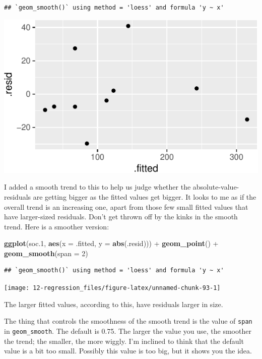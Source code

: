 \documentclass[]{tufte-book}
\newenvironment{Shaded}{}{}
\newcommand{\DataTypeTok}[1]{\textcolor[rgb]{0.56,0.13,0.00}{#1}}
\newcommand{\DecValTok}[1]{\textcolor[rgb]{0.25,0.63,0.44}{#1}}
\newcommand{\FloatTok}[1]{\textcolor[rgb]{0.25,0.63,0.44}{#1}}
\newcommand{\KeywordTok}[1]{\textcolor[rgb]{0.00,0.44,0.13}{\textbf{#1}}}
\newcommand{\NormalTok}[1]{#1}
\newcommand{\OperatorTok}[1]{\textcolor[rgb]{0.40,0.40,0.40}{#1}}
\newcommand{\StringTok}[1]{\textcolor[rgb]{0.25,0.44,0.63}{#1}}
\theoremstyle{definition}
\theoremstyle{definition}
\theoremstyle{definition}
\theoremstyle{remark}
\begin{document}
\begin{verbatim}
## `geom_smooth()` using method = 'loess' and formula 'y ~ x'
\end{verbatim}

\includegraphics{12-regression_files/figure-latex/unnamed-chunk-92-1}

I added a smooth trend to this to help us judge whether the
absolute-value-residuals are getting bigger as the fitted values get
bigger. It looks to me as if the overall trend is an increasing one,
apart from those few small fitted values that have larger-sized
residuals. Don't get thrown off by the kinks in the smooth trend. Here
is a smoother version:

\begin{Shaded}
\begin{Highlighting}[]
\KeywordTok{ggplot}\NormalTok{(soc}\FloatTok{.1}\NormalTok{, }\KeywordTok{aes}\NormalTok{(}\DataTypeTok{x =}\NormalTok{ .fitted, }\DataTypeTok{y =} \KeywordTok{abs}\NormalTok{(.resid))) }\OperatorTok{+}\StringTok{ }
\StringTok{    }\KeywordTok{geom_point}\NormalTok{() }\OperatorTok{+}\StringTok{ }\KeywordTok{geom_smooth}\NormalTok{(}\DataTypeTok{span =} \DecValTok{2}\NormalTok{)}
\end{Highlighting}
\end{Shaded}

\begin{verbatim}
## `geom_smooth()` using method = 'loess' and formula 'y ~ x'
\end{verbatim}

\texttt{[image: 12-regression\_files/figure-latex/unnamed-chunk-93-1]}

The larger fitted values, according to this, have residuals larger in
size.

The thing that controls the smoothness of the smooth trend is the value
of \texttt{span} in \texttt{geom\_smooth}. The default is 0.75. The
larger the value you use, the smoother the trend; the smaller, the more
wiggly. I'm inclined to think that the default value is a bit too small.
Possibly this value is too big, but it shows you the idea.
\end{document}
